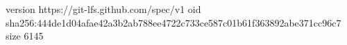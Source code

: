 version https://git-lfs.github.com/spec/v1
oid sha256:444de1d04afae42a3b2ab788ee4722c733ce587c01b61f363892abe371cc96c7
size 6145
